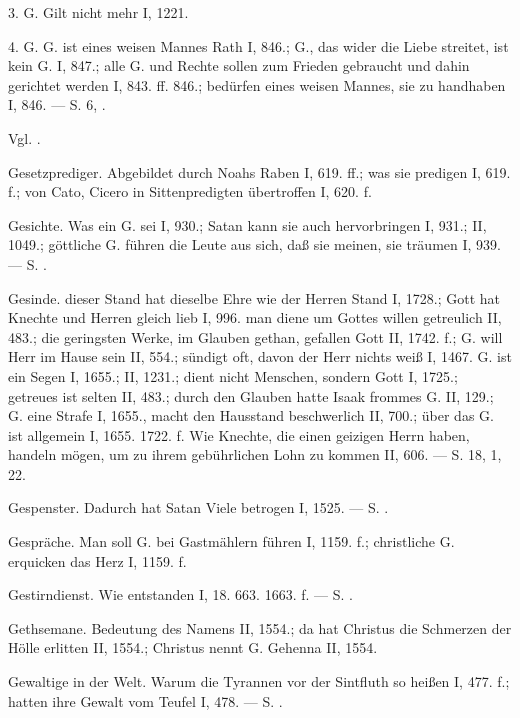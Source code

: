 3.  G. Gilt nicht mehr I, 1221.

4.  G. G. ist eines weisen Mannes Rath I, 846.; G., das wider die Liebe streitet, ist kein G. I, 847.; alle G. und Rechte sollen zum Frieden gebraucht und dahin gerichtet werden I, 843. ff. 846.; bedürfen eines weisen Mannes, sie zu handhaben I, 846. — S.  6, .

Vgl. .

Gesetzprediger. Abgebildet durch Noahs Raben I, 619. ff.; was sie predigen I, 619. f.; von Cato, Cicero in Sittenpredigten übertroffen I, 620. f.

Gesichte. Was ein G. sei I, 930.; Satan kann sie auch hervorbringen I, 931.; II, 1049.; göttliche G. führen die Leute aus sich, daß sie meinen, sie träumen I, 939. — S. .

Gesinde.  dieser Stand hat dieselbe Ehre wie der Herren Stand I, 1728.; Gott hat Knechte und Herren gleich lieb I, 996.  man diene um Gottes willen getreulich II, 483.; die geringsten Werke, im Glauben gethan, gefallen Gott II, 1742. f.; G. will Herr im Hause sein II, 554.; sündigt oft, davon der Herr nichts weiß I, 1467.  G. ist ein Segen I, 1655.; II, 1231.;  dient nicht Menschen, sondern Gott I, 1725.; getreues ist selten II, 483.; durch den Glauben hatte Isaak frommes G. II, 129.;  G. eine Strafe I, 1655., macht den Hausstand beschwerlich II, 700.;  über das G. ist allgemein I, 1655. 1722. f. Wie Knechte, die einen geizigen Herrn haben, handeln mögen, um zu ihrem gebührlichen Lohn zu kommen II, 606. — S.  18,  1,  22.

Gespenster. Dadurch hat Satan Viele betrogen I, 1525. — S. .

Gespräche. Man soll G. bei Gastmählern führen I, 1159. f.; christliche G. erquicken das Herz I, 1159. f.

Gestirndienst. Wie entstanden I, 18. 663. 1663. f. — S. .

Gethsemane. Bedeutung des Namens II, 1554.; da hat Christus die Schmerzen der Hölle erlitten II, 1554.; Christus nennt G. Gehenna II, 1554.

Gewaltige in der Welt. Warum die Tyrannen vor der
Sintfluth so heißen I, 477. f.; hatten ihre Gewalt vom Teufel I, 478. — S. .

